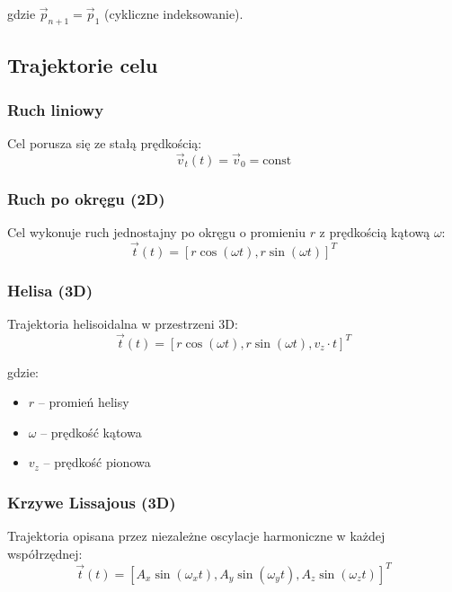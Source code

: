 \documentclass[12pt,a4paper]{article}
\begin{document}
gdzie $\vec{p}_{n+1} = \vec{p}_1$ (cykliczne indeksowanie).

\subsection{Trajektorie celu}

\subsubsection{Ruch liniowy}

Cel porusza się ze stałą prędkością:
\begin{equation}
\vec{v}_t(t) = \vec{v}_0 = \text{const}
\end{equation}

\subsubsection{Ruch po okręgu (2D)}

Cel wykonuje ruch jednostajny po okręgu o promieniu $r$ z prędkością kątową $\omega$:
\begin{equation}
\vec{t}(t) = [r\cos(\omega t), r\sin(\omega t)]^T
\end{equation}

\subsubsection{Helisa (3D)}

Trajektoria helisoidalna w przestrzeni 3D:
\begin{equation}
\vec{t}(t) = [r\cos(\omega t), r\sin(\omega t), v_z \cdot t]^T
\end{equation}

gdzie:
\begin{itemize}
    \item $r$ -- promień helisy
    \item $\omega$ -- prędkość kątowa
    \item $v_z$ -- prędkość pionowa
\end{itemize}

\subsubsection{Krzywe Lissajous (3D)}

Trajektoria opisana przez niezależne oscylacje harmoniczne w każdej współrzędnej:
\begin{equation}
\vec{t}(t) = [A_x \sin(\omega_x t), A_y \sin(\omega_y t), A_z \sin(\omega_z t)]^T
\end{equation}
\end{document}
